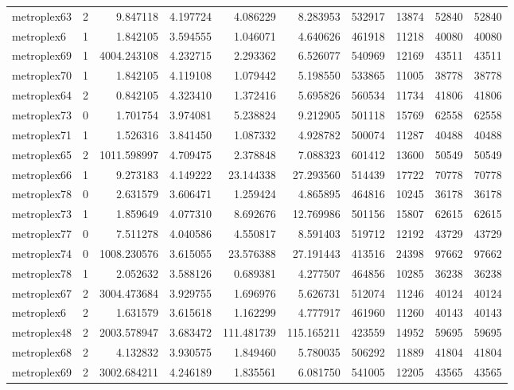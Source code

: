 \begin{longtable}{|l|r|r|r|r|r|r|r|r|r|}
metroplex63 & 2 & 9.847118 & 4.197724 & 4.086229 & 8.283953 & 532917 & 13874 & 52840 & 52840 \\
metroplex6 & 1 & 1.842105 & 3.594555 & 1.046071 & 4.640626 & 461918 & 11218 & 40080 & 40080 \\
metroplex69 & 1 & 4004.243108 & 4.232715 & 2.293362 & 6.526077 & 540969 & 12169 & 43511 & 43511 \\
metroplex70 & 1 & 1.842105 & 4.119108 & 1.079442 & 5.198550 & 533865 & 11005 & 38778 & 38778 \\
metroplex64 & 2 & 0.842105 & 4.323410 & 1.372416 & 5.695826 & 560534 & 11734 & 41806 & 41806 \\
metroplex73 & 0 & 1.701754 & 3.974081 & 5.238824 & 9.212905 & 501118 & 15769 & 62558 & 62558 \\
metroplex71 & 1 & 1.526316 & 3.841450 & 1.087332 & 4.928782 & 500074 & 11287 & 40488 & 40488 \\
metroplex65 & 2 & 1011.598997 & 4.709475 & 2.378848 & 7.088323 & 601412 & 13600 & 50549 & 50549 \\
metroplex66 & 1 & 9.273183 & 4.149222 & 23.144338 & 27.293560 & 514439 & 17722 & 70778 & 70778 \\
metroplex78 & 0 & 2.631579 & 3.606471 & 1.259424 & 4.865895 & 464816 & 10245 & 36178 & 36178 \\
metroplex73 & 1 & 1.859649 & 4.077310 & 8.692676 & 12.769986 & 501156 & 15807 & 62615 & 62615 \\
metroplex77 & 0 & 7.511278 & 4.040586 & 4.550817 & 8.591403 & 519712 & 12192 & 43729 & 43729 \\
metroplex74 & 0 & 1008.230576 & 3.615055 & 23.576388 & 27.191443 & 413516 & 24398 & 97662 & 97662 \\
metroplex78 & 1 & 2.052632 & 3.588126 & 0.689381 & 4.277507 & 464856 & 10285 & 36238 & 36238 \\
metroplex67 & 2 & 3004.473684 & 3.929755 & 1.696976 & 5.626731 & 512074 & 11246 & 40124 & 40124 \\
metroplex6 & 2 & 1.631579 & 3.615618 & 1.162299 & 4.777917 & 461960 & 11260 & 40143 & 40143 \\
metroplex48 & 2 & 2003.578947 & 3.683472 & 111.481739 & 115.165211 & 423559 & 14952 & 59695 & 59695 \\
metroplex68 & 2 & 4.132832 & 3.930575 & 1.849460 & 5.780035 & 506292 & 11889 & 41804 & 41804 \\
metroplex69 & 2 & 3002.684211 & 4.246189 & 1.835561 & 6.081750 & 541005 & 12205 & 43565 & 43565 \\

\end{longtable}

